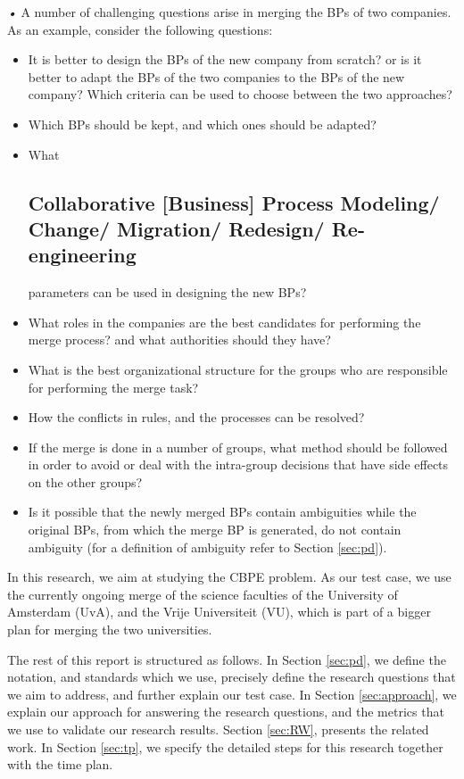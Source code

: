 \documentclass{article}
\begin{document}
\emph{•}
A number of challenging questions arise in merging the BPs of two companies.
As an example, consider the following questions:
\begin{itemize}
  \item It is better to design the BPs of the new company from scratch? or is it better to adapt the BPs of the two companies to the BPs of the new company? Which criteria can be used to choose between the two approaches?
  \item Which BPs should be kept, and which ones should be adapted?
  \item What\subsection{Collaborative [Business] Process Modeling/ Change/ Migration/ Redesign/ Re-engineering}
 parameters can be used in designing the new BPs?
  \item What roles in the companies are the best candidates for performing the merge process? and what authorities should they have?
  \item What is the best organizational structure for the groups who are responsible for performing the merge task?
  \item How the conflicts in rules, and the processes can be resolved?
  \item If the merge is done in a number of groups, what method should be followed in order to avoid or deal with the intra-group decisions that have side effects on the other groups?
  \item Is it possible that the newly merged BPs contain ambiguities while the original BPs, from which the merge BP is generated, do not contain ambiguity (for a definition of ambiguity refer to Section \ref{sec:pd}).
\end{itemize}

In this research, we aim at studying the CBPE problem.
As our test case, we use the currently ongoing merge of the science faculties of the University of Amsterdam (UvA), and the Vrije Universiteit (VU), which is part of a bigger plan for merging the two universities.

The rest of this report is structured as follows.
In Section \ref{sec:pd}, we define the notation, and standards which we use, precisely define the research questions that we aim to address, and further explain our test case.
In Section \ref{sec:approach}, we explain our approach for answering the research questions, and the metrics that we use to validate our research results.
Section \ref{sec:RW}, presents the related work.
In Section \ref{sec:tp}, we specify the detailed steps for this research together with the time plan.
\end{document}
